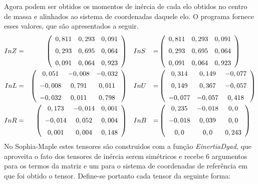 Agora podem ser obtidos os momentos de inércia de cada elo obtidos no
centro de massa e alinhados ao sistema de coordenadas daquele elo. O programa
fornece esses valores, que são apresentados a seguir.
%
\begin{align*}
InZ &=& \left( \begin {array}{ccc}  0,811& 0,293& 0,091\\ \noalign{\medskip}
 0,293& 0,695& 0,064\\ \noalign{\medskip} 0,091& 0,064& 0,923
\end {array} \right) & \quad InS &=& \left( \begin {array}{ccc}  0,811& 0,293& 0,091\\ \noalign{\medskip}
 0,293& 0,695& 0,064\\ \noalign{\medskip} 0,091& 0,064& 0,923
\end {array} \right) \\
InL &=&  \left( \begin {array}{ccc}  0,051&-
0,008&- 0,032 \\ \noalign{\medskip}- 0,008& 0,791& 0,011\\ \noalign{\medskip}- 0,032
& 0,011& 0,798\end {array} \right) & \quad InU &=& \left( \begin {array}{ccc} 
0,314& 0,149&- 0,077\\ \noalign{\medskip} 0,149& 0,367&- 0,057\\ \noalign{\medskip}- 0,077&- 0,057& 0,418
\end {array} \right) \\
InR &=&  \left( \begin {array}{ccc}  0,173&-
0,014& 0,001\\ \noalign{\medskip} - 0,014& 0,052& 0,004\\ \noalign{\medskip} 0,001& 0,004& 0,148
\end {array} \right) & \quad InB &=&  \left( \begin {array}{ccc}  0,235&- 0,018& 0,0\\ \noalign{\medskip}-
 0,018& 0,039& 0,0\\ \noalign{\medskip} 0,0& 0,0& 0,243\end {array}
 \right)
\end{align*}
%
No Sophia-Maple estes tensores são construidos com a função
\textit{EinertiaDyad}, que aproveita o fato dos tensores de inércia serem
simétricos e recebe 6 argumentos para os termos da matriz e um para o sistema de
coordenadas de referência em que foi obtido o tensor. Define-se portanto cada
tensor da seguinte forma:

